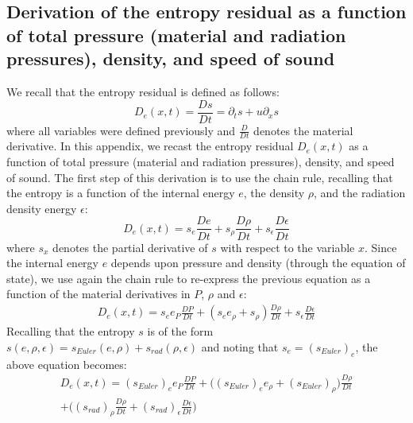 \documentclass[review]{elsarticle}
\begin{document}
\begin{appendices}
\section{Derivation of the entropy residual as a function of total pressure (material and radiation pressures), density, and speed of sound}
\label{app:appendixC}
%
We recall that the entropy residual is defined as follows:
\begin{equation}\label{app:ent}
D_e(x,t) = \frac{D s}{Dt} = \partial_t s + u \partial_x s
\end{equation}
where all variables were defined previously and $\frac{D}{Dt}$ denotes the material derivative. In this appendix, we recast the entropy residual $D_e(x,t)$ as a function of total pressure (material and radiation pressures), density, and speed of sound. The first step of this derivation is to use the chain rule, recalling that the entropy is a function of the internal energy $e$, the density $\rho$, and the radiation density energy $\epsilon$:
%
\begin{equation}\label{app:ent2}
D_e(x,t) = s_e \frac{D e}{Dt} + s_\rho \frac{D \rho}{Dt} + s_\epsilon \frac{D \epsilon}{Dt} \nonumber
\end{equation}
% 
where $s_x$ denotes the partial derivative of $s$ with respect to the variable $x$. Since the internal energy $e$ depends upon pressure and density (through the equation of state), we use again the chain rule to re-express the previous equation as a function of the material derivatives in $P$, $\rho$ and $\epsilon$:
%
\begin{align}
D_e(x,t) = s_e e_P \frac{D P}{Dt} + ( s_e e_\rho + s_\rho ) \frac{D \rho}{Dt} + s_\epsilon \frac{D \epsilon}{Dt} \nonumber
\end{align}
%
Recalling that the entropy $s$ is of the form $s(e,\rho,\epsilon) = s_{Euler}(e,\rho) + s_{rad}(\rho,\epsilon)$ and noting that $s_e = (s_{Euler})_e$, the above equation becomes:
%
\begin{multline}\label{app:ent3}
D_e(x,t) = (s_{Euler})_e e_P \frac{D P}{Dt} + \Big( (s_{Euler})_e e_\rho + (s_{Euler})_\rho \Big) \frac{D \rho}{Dt} \\ 
   + \Big( (s_{rad})_\rho \frac{D \rho}{Dt} + (s_{rad})_\epsilon \frac{D \epsilon}{Dt} \Big)  \\

\end{multline}
\end{appendices}
\end{document}
